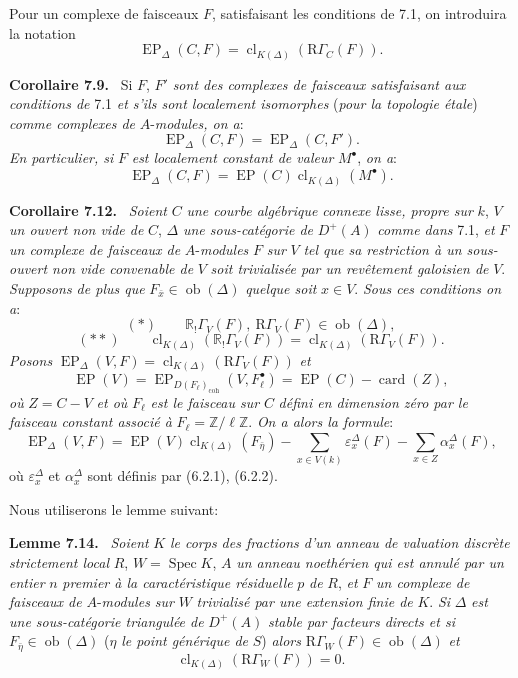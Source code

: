 \documentclass[11pt]{article}
\newenvironment{statement}[1]{\par\medskip\noindent\textbf{#1.}\ }{\par\medskip}
\DeclareMathOperator{\Spec}{Spec}
\newcommand{\R}{\mathbb{R}}\newcommand{\RHomCore}{\mathbb{R}\mathrm{Hom}}
\providecommand{\EP}{\operatorname{EP}}
\providecommand{\coh}{\mathrm{coh}}
\providecommand{\Ob}{\operatorname{ob}}
\providecommand{\Ob}{\operatorname{ob}}
\providecommand{\R}{\mathrm R}
\providecommand{\Spec}{\operatorname{Spec}}
\providecommand{\EP}{\operatorname{EP}}
\providecommand{\Spec}{\operatorname{Spec}}
\providecommand{\Ob}{\operatorname{Ob}}
\providecommand{\coh}{\mathrm{coh}}
\providecommand{\clK}[1]{\operatorname{cl}_{K(#1)}}
\providecommand{\Spec}{\operatorname{Spec}}
\providecommand{\Ob}{\operatorname{ob}}
\providecommand{\Spec}{\operatorname{Spec}}
\providecommand{\Ob}{\operatorname{Ob}}
\begin{document}
Pour un complexe de faisceaux $F$, satisfaisant les conditions de 7.1, on introduira la notation
\[
\EP_\Delta(C,F)=\clK{\Delta}(\mathrm{R}\Gamma_C(F)).
\]

\begin{statement}{Corollaire 7.9}
Si $F$, $F'$ \emph{sont des complexes de faisceaux satisfaisant aux conditions de} 7.1 \emph{et s'ils sont localement isomorphes} (\emph{pour la topologie étale}) \emph{comme complexes de} $A$-\emph{modules, on a}:
\[
\EP_\Delta(C,F)=\EP_\Delta(C,F').
\tag{7.10}
\]
\emph{En particulier, si} $F$ \emph{est localement constant de valeur} $M^\bullet$, \emph{on a}:
\[
\EP_\Delta(C,F)=\EP(C)\clK{\Delta}(M^\bullet).
\tag{7.11}
\]
\end{statement}

\begin{statement}{Corollaire 7.12}
\emph{Soient} $C$ \emph{une courbe algébrique connexe lisse, propre sur} $k$, $V$ \emph{un ouvert non vide de} $C$, $\Delta$ \emph{une sous-catégorie de} $D^+(A)$ \emph{comme dans} 7.1, \emph{et} $F$ \emph{un complexe de faisceaux de} $A$-\emph{modules} $F$ \emph{sur} $V$ \emph{tel que sa restriction à un sous-ouvert non vide convenable de} $V$ \emph{soit trivialisée par un revêtement galoisien de} $V$. \emph{Supposons de plus que} $F_{\bar x}\in\Ob(\Delta)$ \emph{quelque soit} $x\in V$. \emph{Sous ces conditions on a}:
\[
(*)\qquad \R_!\Gamma_V(F),\ \mathrm{R}\Gamma_V(F)\in\Ob(\Delta),
\]
\[
(**)\qquad
\clK{\Delta}(\R_!\Gamma_V(F))=\clK{\Delta}(\mathrm{R}\Gamma_V(F)).
\]
\emph{Posons} $\EP_\Delta(V,F)=\clK{\Delta}(\mathrm{R}\Gamma_V(F))$ \emph{et}
\[
\EP(V)=\EP_{D(F_\ell)_{\coh}}(V,F_\ell^\bullet)=\EP(C)-\operatorname{card}(Z),
\]
\emph{où} $Z=C-V$ \emph{et où} $F_\ell$ \emph{est le faisceau sur} $C$ \emph{défini en dimension zéro par le faisceau constant associé à} $F_\ell=\mathbb Z/\ell\mathbb Z$. \emph{On a alors la formule}:
\[
\EP_\Delta(V,F)
=
\EP(V)\clK{\Delta}(F_{\bar\eta})
-\sum_{x\in V(k)}\varepsilon_x^\Delta(F)
-\sum_{x\in Z}\alpha_x^\Delta(F),
\tag{7.13}
\]
où $\varepsilon_x^\Delta$ et $\alpha_x^\Delta$ sont
définis par (6.2.1), (6.2.2).
\end{statement}

Nous utiliserons le lemme suivant:

\begin{statement}{Lemme 7.14}
\emph{Soient} $K$ \emph{le corps des fractions d'un anneau de valuation discrète strictement local} $R$, $W=\Spec K$, $A$ \emph{un anneau noethérien qui est annulé par un entier} $n$ \emph{premier à la caractéristique résiduelle} $p$ \emph{de} $R$, \emph{et} $F$ \emph{un complexe de faisceaux de} $A$-\emph{modules sur} $W$ \emph{trivialisé par une extension finie de} $K$. \emph{Si} $\Delta$ \emph{est une sous-catégorie triangulée de} $D^+(A)$ \emph{stable par facteurs directs et si} $F_{\bar\eta}\in\Ob(\Delta)$ ($\eta$ \emph{le point générique de} $S$) \emph{alors} $\mathrm{R}\Gamma_W(F)\in\Ob(\Delta)$ \emph{et}
\[
\clK{\Delta}(\mathrm{R}\Gamma_W(F))=0.
\]
\end{statement}
\end{document}
